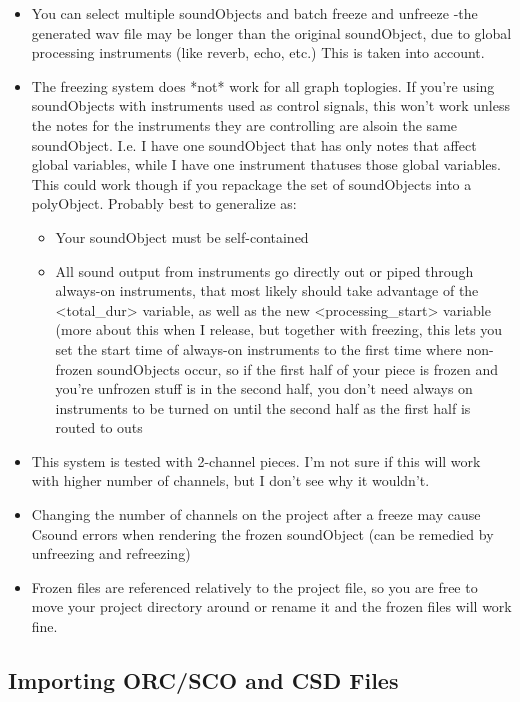 \begin{itemize}
\item
  You can select multiple soundObjects and batch freeze and unfreeze
  -the generated wav file may be longer than the original soundObject,
  due to global processing instruments (like reverb, echo, etc.) This is
  taken into account.
\item
  The freezing system does *not* work for all graph toplogies. If you're
  using soundObjects with instruments used as control signals, this
  won't work unless the notes for the instruments they are controlling
  are alsoin the same soundObject. I.e. I have one soundObject that has
  only notes that affect global variables, while I have one instrument
  thatuses those global variables. This could work though if you
  repackage the set of soundObjects into a polyObject. Probably best to
  generalize as:

  \begin{itemize}
  \item
    Your soundObject must be self-contained
  \item
    All sound output from instruments go directly out or piped through
    always-on instruments, that most likely should take advantage of the
    \textless{}total\_dur\textgreater{} variable, as well as the new
    \textless{}processing\_start\textgreater{} variable (more about this
    when I release, but together with freezing, this lets you set the
    start time of always-on instruments to the first time where
    non-frozen soundObjects occur, so if the first half of your piece is
    frozen and you're unfrozen stuff is in the second half, you don't
    need always on instruments to be turned on until the second half as
    the first half is routed to outs
  \end{itemize}
\item
  This system is tested with 2-channel pieces. I'm not sure if this will
  work with higher number of channels, but I don't see why it wouldn't.
\item
  Changing the number of channels on the project after a freeze may
  cause Csound errors when rendering the frozen soundObject (can be
  remedied by unfreezing and refreezing)
\item
  Frozen files are referenced relatively to the project file, so you are
  free to move your project directory around or rename it and the frozen
  files will work fine.
\end{itemize}


\subsection{Importing ORC/SCO and CSD Files}\label{importCSD}

